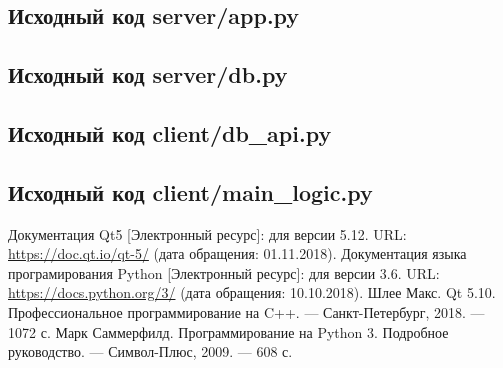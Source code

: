 \subsection{Исходный код server/app.py}



\clearpage
\subsection{Исходный код server/db.py}



% 


\clearpage
\subsection{Исходный код client/db\_api.py}



\clearpage
\subsection{Исходный код client/main\_logic.py}



\clearpage
{}
\begin{thebibliography}{}
    \bibitem{}
    Документация Qt5 [Электронный ресурс]: для версии 5.12. URL: \url{https://doc.qt.io/qt-5/} (дата обращения: 01.11.2018).
    \bibitem{}
    Документация языка програмирования Python [Электронный ресурс]: для версии 3.6. URL: \url{https://docs.python.org/3/} (дата обращения: 10.10.2018).
    \bibitem{}
    Шлее Макс. Qt 5.10. Профессиональное программирование на C++. --- Санкт-Петербург, 2018. --- 1072 с.
    \bibitem{}
    Марк Саммерфилд. Программирование на Python 3. Подробное руководство. --- Символ-Плюс, 2009. --- 608 с.
\end{thebibliography}